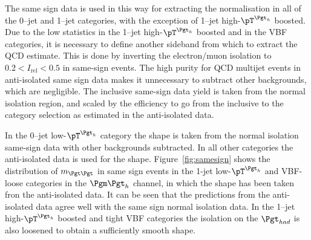 The same sign data is used in this way for extracting the normalisation in all of the
0--jet and 1--jet
categories, with the exception of 1--jet high-$\pT^{\Pgth}$ boosted.
Due to the low statistics in the 1--jet high-$\pT^{\Pgth}$ boosted and in the VBF
categories, it is necessary to define another
sideband from which to extract the QCD estimate. This is done by inverting the
electron/muon isolation to $0.2 < I_{\text{rel}} < 0.5$ in same-sign events. 
The high purity for QCD multijet events in anti-isolated same sign data makes 
it unnecessary to subtract other backgrounds, which are negligible. 
The inclusive same-sign data yield is taken from the normal 
isolation region, and scaled by the efficiency to go from the inclusive to the 
category selection as estimated in the anti-isolated data. 

In the 0--jet low-$\pT^{\Pgth}$ category the shape is taken from the normal
isolation same-sign data with other backgrounds subtracted. In all other
categories the anti-isolated data is used for the shape.
Figure~\ref{fig:samesign} shows the distribution of $m_{\Pgt\Pgt}$ in same sign
events in the 1-jet low-$\pT^{\Pgth}$ and VBF-loose categories in the $\mutau$
channel, in which the shape has been taken fron the anti-isolated data. It can be seen that the
predictions from the anti-isolated data agree well with the same sign normal
isolation data. In the 1--jet
high-$\pT^{\Pgth}$ boosted and tight VBF categories the isolation on the
$\Pgt_{had}$ is also loosened to obtain a sufficiently smooth shape. 

